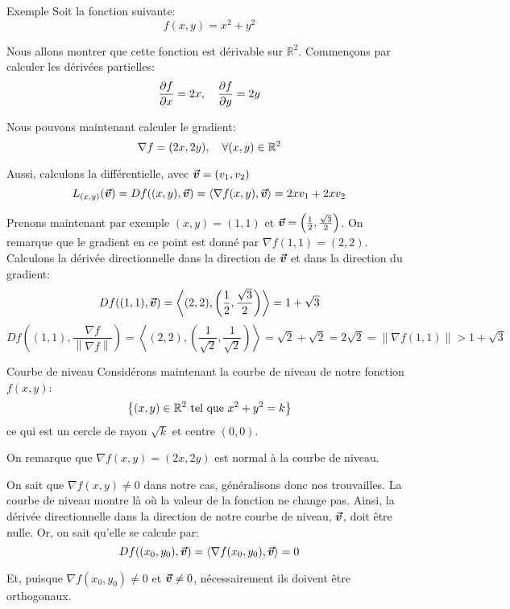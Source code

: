 \documentclass[a4paper]{article}
\begin{document}
\begin{parag}{Exemple}
    Soit la fonction suivante: 
    \[f\left(x, y\right) = x^2 + y^2\]

    Nous allons montrer que cette fonction est dérivable sur $\mathbb{R}^2$. Commençons par calculer les dérivées partielles: 
    \[\frac{\partial f}{\partial x} = 2x, \quad \frac{\partial f}{\partial y} = 2y\]
    
    Nous pouvons maintenant calculer le gradient: 
    \[\nabla f = \left(2x, 2y\right), \mathspace \forall \left(x, y\right) \in\mathbb{R}^2\]
    
    Aussi, calculons la différentielle, avec $\bvec{v} = \left(v_1, v_2\right)$
    \[L_{\left(x, y\right)}\left(\bvec{v}\right) = D f\left(\left(x, y\right), \bvec{v}\right) = \left<\nabla f\left(x, y\right), \bvec{v}\right> = 2xv_1 + 2xv_2\]

    Prenons maintenant par exemple $\left(x, y\right) = \left(1, 1\right)$ et $\bvec{v} = \left(\frac{1}{2}, \frac{\sqrt{3}}{2}\right)$. On remarque que le gradient en ce point est donné par $\nabla f\left(1, 1\right) = \left(2, 2\right)$. Calculons la dérivée directionnelle dans la direction de $\bm{\protect\vec{v}}$ et dans la direction du gradient: 
    \[D f\left(\left(1, 1\right), \bvec{v}\right) = \left<\left(2, 2\right), \left(\frac{1}{2}, \frac{\sqrt{3}}{2}\right)\right> = 1 + \sqrt{3}\] 
    \[D f\left(\left(1, 1\right), \frac{\nabla f}{\left\|\nabla f\right\|}\right) = \left<\left(2, 2\right), \left(\frac{1}{\sqrt{2}}, \frac{1}{\sqrt{2}}\right)\right> = \sqrt{2} + \sqrt{2} = 2\sqrt{2} = \left\|\nabla f\left(1, 1\right)\right\| > 1 + \sqrt{3}\]
    
    \begin{subparag}{Courbe de niveau}
        Considérons maintenant la courbe de niveau de notre fonction $f\left(x, y\right)$: 
        \[\left\{\left(x, y\right) \in \mathbb{R}^2 \telque x^2 + y^2 = k\right\}\]
        ce qui est un cercle de rayon $\sqrt{k}$ et centre $\left(0, 0\right)$.
        
        On remarque que $\nabla f\left(x, y\right) = \left(2x, 2y\right)$ est normal à la courbe de niveau.

        
        On sait que $\nabla f\left(x, y\right) \neq 0$ dans notre cas, généralisons donc nos trouvailles. La courbe de niveau montre là où la valeur de la fonction ne change pas. Ainsi, la dérivée directionnelle dans la direction de notre courbe de niveau, $\bm{\protect\vec{v}}$, doit être nulle. Or, on sait qu'elle se calcule par: 
        \[D f\left(\left(x_0, y_0\right), \bvec{v}\right) = \left<\nabla f\left(x_0, y_0\right), \bvec{v}\right> = 0\]
        
        Et, puisque $\nabla f\left(x_0, y_0\right) \neq 0$ et $\bm{\protect\vec{v}} \neq 0$, nécessairement ils doivent être orthogonaux.
    \end{subparag}
\end{parag}
\end{document}
